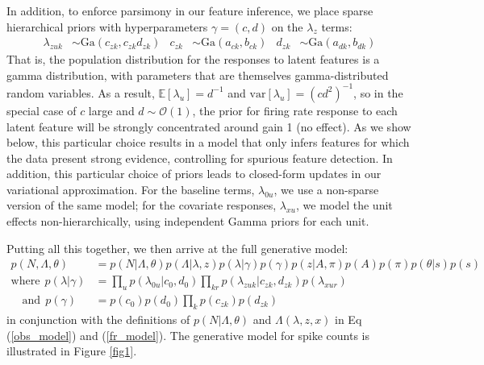 \documentclass[10pt,letterpaper]{article}
\begin{document}
In addition, to enforce parsimony in our feature inference, we place sparse hierarchical priors with hyperparameters $\gamma = (c, d)$ on the $\lambda_z$ terms:
\begin{align}
    \label{hierarchy}
    \lambda_{zuk} &\sim \text{Ga}(c_{zk}, c_{zk} d_{zk}) & c_{zk} &\sim \text{Ga}(a_{ck}, b_{ck})
    & d_{zk} &\sim \text{Ga}(a_{dk}, b_{dk})
\end{align}
That is, the population distribution for the responses to latent features is a gamma distribution, with parameters that are themselves gamma-distributed random variables. As a result, $\mathbb{E}[\lambda_u] = d^{-1}$ and $\text{var}[\lambda_u] = (cd^2)^{-1}$, so in the special case of $c$ large and $d\sim \mathcal{O}(1)$, the prior for firing rate response to each latent feature will be strongly concentrated around gain 1 (no effect). As we show below, this particular choice results in a model that only infers features for which the data present strong evidence, controlling for spurious feature detection. In addition, this particular choice of priors leads to closed-form updates in our variational approximation. For the baseline terms, $\lambda_{0u}$, we use a non-sparse version of the same model; for the covariate responses, $\lambda_{xu}$, we model the unit effects non-hierarchically, using independent Gamma priors for each unit.

Putting all this together, we then arrive at the full generative model:
\begin{align}
    p(N, \Lambda, \theta) &= p(N| \Lambda, \theta)p(\Lambda|\lambda, z)
    p(\lambda|\gamma) p(\gamma)
    p(z|A, \pi)
    p(A)p(\pi)p(\theta|s)p(s) \\
    \text{where} ~~ p(\lambda|\gamma) &= \prod_u p(\lambda_{0u}|c_0, d_0)\prod_{kr} p(\lambda_{zuk}|c_{zk}, d_{zk}) p(\lambda_{xur}) \\
    \text{~~ and} ~~ p(\gamma) &= p(c_0)p(d_0)\prod_k p(c_{zk}) p(d_{zk})
\end{align}
in conjunction with the definitions of $p(N|\Lambda, \theta)$ and $\Lambda(\lambda, z, x)$ in Eq (\ref{obs_model}) and (\ref{fr_model}). The generative model for spike counts is illustrated in Figure \ref{fig1}.
\end{document}
